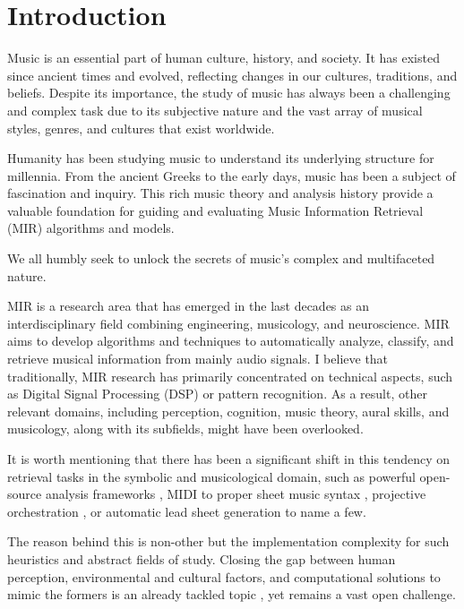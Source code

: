 \chapter{Introduction}

Music is an essential part of human culture, history, and society. It has existed since ancient times and evolved, reflecting changes in our cultures, traditions, and beliefs. Despite its importance, the study of music has always been a challenging and complex task due to its subjective nature and the vast array of musical styles, genres, and cultures that exist worldwide.

Humanity has been studying music to understand its underlying structure for millennia. From the ancient Greeks to the early days, music has been a subject of fascination and inquiry. This rich music theory and analysis history provide a valuable foundation for guiding and evaluating Music Information Retrieval (MIR) algorithms and models. 

We all humbly seek to unlock the secrets of music's complex and multifaceted nature.

MIR is a research area that has emerged in the last decades as an interdisciplinary field combining engineering, musicology, and neuroscience. MIR aims to develop algorithms and techniques to automatically analyze, classify, and retrieve musical information from mainly audio signals. I believe that traditionally, MIR research has primarily concentrated on technical aspects, such as Digital Signal Processing (DSP) or pattern recognition. As a result, other relevant domains, including perception, cognition, music theory, aural skills, and musicology, along with its subfields, might have been overlooked. 

It is worth mentioning that there has been a significant shift in this tendency on retrieval tasks in the symbolic and musicological domain, such as powerful open-source analysis frameworks \cite{ScottCuthbertChristopherArizaMusic21:Data}, MIDI to proper sheet music syntax \cite{Suzuki2021ScoreRepresentation}, projective orchestration \cite{Crestel2018AOrchestration}, or automatic lead sheet generation \cite{WeilAutomaticSignals} to name a few.

The reason behind this is non-other but the implementation complexity for such heuristics and abstract fields of study. Closing the gap between human perception, environmental and cultural factors, and computational solutions to mimic the formers is an already tackled topic \cite{Large1994ResonanceMeter}\cite{Mullensiefen2003MeasuringJudgments}\cite{Sears2014PerceivingCadence}\cite{Thaut2014HumanPatter}, yet remains a vast open challenge.